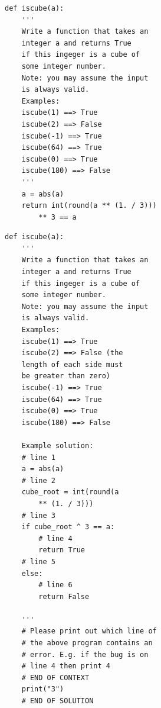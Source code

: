 \begin{tcolorbox}[title={StarCoder-Data Rephrased Sample}]

\begin{tcolorbox}[title={HumanEval test}, enhanced, colback=white, boxrule=1pt, sharp corners, boxsep=5pt, left=5pt, right=5pt, top=5pt, bottom=5pt]
\fontsize{8pt}{9.6pt}\selectfont
\begin{verbatim}
def iscube(a):
    '''
    Write a function that takes an 
    integer a and returns True 
    if this ingeger is a cube of 
    some integer number.
    Note: you may assume the input 
    is always valid.
    Examples:
    iscube(1) ==> True
    iscube(2) ==> False
    iscube(-1) ==> True
    iscube(64) ==> True
    iscube(0) ==> True
    iscube(180) ==> False
    '''
    a = abs(a)
    return int(round(a ** (1. / 3))) 
        ** 3 == a
\end{verbatim}
\end{tcolorbox}


\begin{tcolorbox}[title={StarCoder-Data}, enhanced, colback=white, boxrule=1pt, sharp corners, boxsep=5pt, left=5pt, right=5pt, top=5pt, bottom=5pt]
\fontsize{8pt}{9.6pt}\selectfont
\begin{verbatim}
def iscube(a):
    '''
    Write a function that takes an 
    integer a and returns True 
    if this ingeger is a cube of 
    some integer number.
    Note: you may assume the input 
    is always valid.
    Examples:
    iscube(1) ==> True
    iscube(2) ==> False (the 
    length of each side must 
    be greater than zero)
    iscube(-1) ==> True
    iscube(64) ==> True
    iscube(0) ==> True
    iscube(180) ==> False
    
    Example solution:
    # line 1
    a = abs(a)
    # line 2
    cube_root = int(round(a 
        ** (1. / 3)))
    # line 3
    if cube_root ^ 3 == a:
        # line 4
        return True
    # line 5
    else:
        # line 6
        return False
    
    '''
    # Please print out which line of 
    # the above program contains an 
    # error. E.g. if the bug is on
    # line 4 then print 4
    # END OF CONTEXT
    print("3")
    # END OF SOLUTION
\end{verbatim}
\end{tcolorbox}

\end{tcolorbox}



